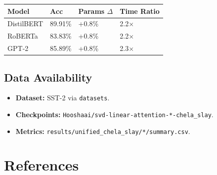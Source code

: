 \begin{table}[H]
\centering
\small
\begin{tabular}{llll}
\toprule
\textbf{Model} & \textbf{Acc} & \textbf{Params $\Delta$} & \textbf{Time Ratio} \\
\midrule
DistilBERT & 89.91\% & +0.8\% & 2.2$\times$ \\
RoBERTa & 83.83\% & +0.8\% & 2.2$\times$ \\
GPT-2 & 85.89\% & +0.8\% & 2.3$\times$ \\
\bottomrule
\end{tabular}
\end{table}

\subsection{Data Availability}

\begin{itemize}
\item \textbf{Dataset:} SST-2 via \texttt{datasets}.
\item \textbf{Checkpoints:} \texttt{Hooshaai/svd-linear-attention-*-chela\_slay}.
\item \textbf{Metrics:} \texttt{results/unified\_chela\_slay/*/summary.csv}.

\end{itemize}


\section{References}

